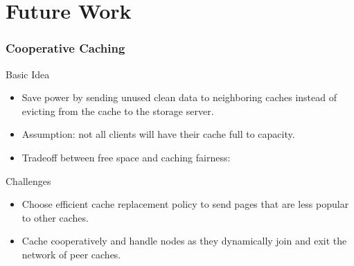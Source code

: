 \documentclass{beamer}
\begin{document}
\section{Future Work}
%
\begin{frame}
    \frametitle{Cooperative Caching}
    \begin{block}{Basic Idea}
	\begin{itemize}
	    \item Save power by sending unused clean data to neighboring caches
		instead of evicting from the cache to the storage server.
	    \item Assumption: not all clients will have their cache full to capacity.
	    \item Tradeoff between free space and caching fairness:
	    \vspace{5pt}
	\end{itemize}
    \end{block}
    \begin{block}{Challenges}
	\begin{itemize}
	    \item Choose efficient cache replacement policy to
		send pages that are less popular to other caches.
	    \item Cache cooperatively and handle nodes as they dynamically
		join and exit the network of peer caches.
	\end{itemize}
    \end{block}
\end{frame}
%
\end{document}
